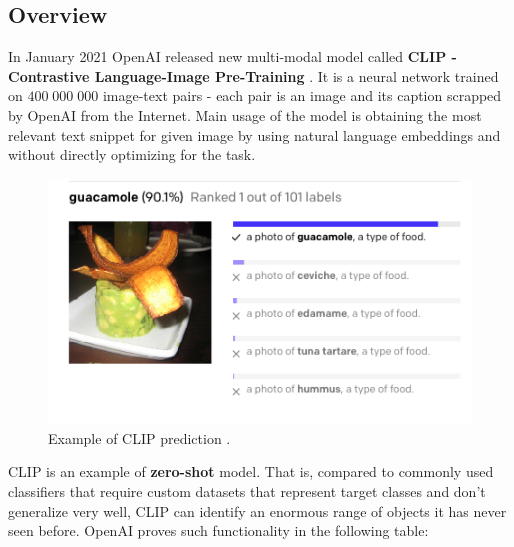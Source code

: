 \documentclass[12pt,a4paper,openany]{book}
\begin{document}
\subsection{Overview}
\noindent In January 2021 OpenAI released new multi-modal model called \textbf{CLIP - Contrastive Language-Image Pre-Training} \cite{clip}.  It is a neural network trained on $400 \;000 \;000$ image-text pairs - each pair is an image and its caption scrapped by OpenAI from the Internet. Main usage of the model is obtaining the most relevant text snippet for given image by using natural language embeddings and without directly optimizing for the task.
 \begin{figure}[ht!]
     \centering
     \includegraphics[scale=0.6]{figs/clip_example.png}
     \caption{Example of CLIP prediction \cite{clip_blog}.}
 \end{figure}
\noindent CLIP is an example of \textbf{zero-shot} model.  That is, compared to commonly used classifiers that require custom datasets that represent target classes and don't generalize very well, CLIP can identify an enormous range of objects it has never seen before. OpenAI proves such functionality in the following table:
\newline
\end{document}
